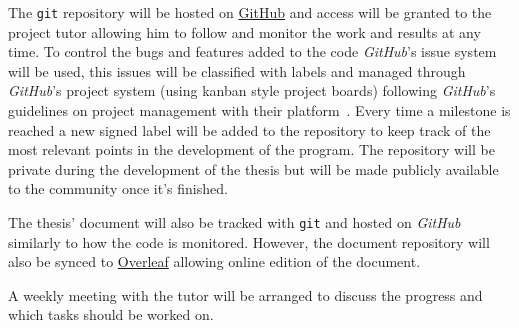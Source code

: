 The \texttt{git} repository will be hosted on \href{github.com}{GitHub} and
access will be granted to the project tutor allowing him to follow and monitor
the work and results at any time. To control the bugs and features added to the
code \emph{GitHub}'s issue system will be used, this issues will be classified
with labels and managed through \emph{GitHub}'s project system (using kanban style
project boards) following \emph{GitHub}'s guidelines on project management with
their platform~\cite{github_managing_2021}.  Every time a milestone is reached a
new signed label will be added to the repository to keep track of the most
relevant points in the development of the program. The repository will be
private during the development of the thesis but will be made publicly available
to the community once it's finished.

The thesis' document will also be tracked with \texttt{git} and hosted on
\emph{GitHub} similarly to how the code is monitored. However, the document
repository will also be synced to \href{overleaf.com}{Overleaf} allowing online
edition of the document.

A weekly meeting with the tutor will be arranged to discuss the progress and
which tasks should be worked on.
